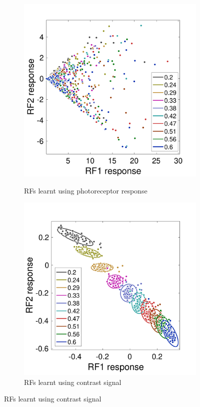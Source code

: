 \documentclass{jov}
\begin{document}
\begin{figure}
\centering
    \begin{subfigure}[b]{0.3	 \textwidth}   
        \caption{RFs learnt using photoreceptor response}
        \includegraphics[width=\textwidth]{../Figures/Figure12/Figure12_a.pdf}
        \label{fig:isomerizationFails}
    \end{subfigure}
        \begin{subfigure}[b]{0.3 \textwidth}
        \caption{RFs learnt using contrast signal}
        \includegraphics[width=\textwidth]{../Figures/Figure12/Figure12_b.pdf}

\end{subfigure}
\end{figure}
\end{document}
